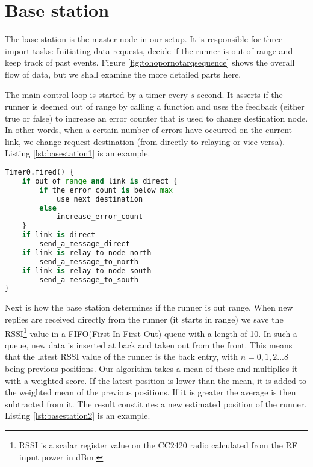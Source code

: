 \section{Base station}\label{sc:basestation}

The base station is the master node in our setup. It is responsible for three import tasks: Initiating data requests, decide if the runner is out of range and keep track of past events. Figure \ref{fig:tohopornotarqsequence} shows the overall flow of data, but we shall examine the more detailed parts here.

\noindent The main control loop is started by a timer every $s$ second. It asserts if the runner is deemed out of range by calling a function and uses the feedback (either true or false) to increase an error counter that is used to change destination node. In other words, when a certain number of errors have occurred on the current link, we change request destination (from directly to relaying or vice versa). Listing \ref{lst:basestation1} is an example.
\noindent
\begin{minipage}[t]{0.95\linewidth}
	\begin{lstlisting}[language=Python, numbers=none, caption=XXX, label={lst:basestation1}]
Timer0.fired() {
	if out of range and link is direct {
		if the error count is below max
			use_next_destination
		else
			increase_error_count
	}
	if link is direct
		send_a_message_direct
	if link is relay to node north
		send_a_message_to_north
	if link is relay to node south
		send_a-message_to_south
}
	\end{lstlisting}
\end{minipage}

\noindent Next is how the base station determines if the runner is out range. When new replies are received directly from the runner (it starts in range) we save the RSSI\footnote{RSSI is a scalar register value on the CC2420 radio calculated from the RF input power in dBm.} value in a FIFO(First In First Out) queue with a length of 10. In such a queue, new data is inserted at back and taken out from the front. This means that the latest RSSI value of the runner is the back entry, with $n=0,1,2 ... 8$ being previous positions. Our algorithm takes a mean of these and multiplies it with a weighted score. If the latest position is lower than the mean, it is added to the weighted mean of the previous positions. If it is greater the average is then subtracted from it. The result constitutes a new estimated position of the runner. Listing \ref{lst:basestation2} is an example.

